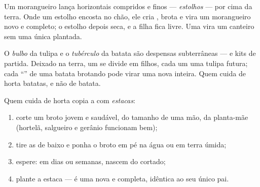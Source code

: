 \begin{example}\label{ex:g4:plants-without-seeds:runner}
Um morangueiro lança  horizontais compridos e finos ---
\emph{estolhos} --- por cima da terra. Onde um
estolho encosta no chão, ele cria , brota  e vira um
morangueiro novo e completo; o estolho depois seca, e a  filha
fica livre. Uma  vira um canteiro sem uma única 
plantada.
\end{example}

\begin{example}\label{ex:g4:plants-without-seeds:bulbtuber}
O \emph{bulbo} da tulipa e o
\emph{tubérculo} da batata são despensas
subterrâneas --- e kits de partida. Deixado na terra, um  se
divide em  filhos, cada um uma tulipa futura; cada ``'' de
uma batata brotando pode virar uma  nova inteira. Quem cuida
de horta  batatas, e não  de batata.
\end{example}

\begin{method}\label{met:g4:plants-without-seeds:cutting}
Quem cuida de horta copia a  com
\emph{estacas}:
\begin{enumerate}
  \item corte um broto jovem e saudável, do tamanho de uma mão, da
        planta-mãe (hortelã, salgueiro e gerânio funcionam bem);
  \item tire as  de baixo e ponha o broto em pé na água ou em
        terra úmida;
  \item espere: em dias ou semanas, nascem  do  cortado;
  \item plante a estaca --- é uma  nova e completa, idêntica
        ao seu único pai.
\end{enumerate}
\end{method}

